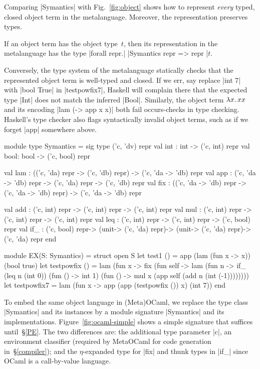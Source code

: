 Comparing |Symantics| with Fig.~\ref{fig:object}
shows how to represent \emph{every} typed, closed object term in the
metalanguage. Moreover, the representation preserves types.
\begin{proposition}
If an object term has the object type~$t$, then its
representation in the metalanguage has the type 
|forall repr.| |Symantics repr => repr |$t$.
\end{proposition}
Conversely, the type system of the metalanguage statically checks that the
represented object term is well-typed and closed.
If we err, say replace |int 7| with |bool True| in
|testpowfix7|, Haskell will complain there that the expected type |Int| does not
match the inferred |Bool|.  Similarly, the object term $\mathopen{\lambda\mathord{x}.\,}xx$ and its
encoding |lam (\x -> app x x)| both fail occurs-checks in type checking.
Haskell's type checker also flags syntactically invalid object terms, 
such as if we forget |app| somewhere above.

\begin{figure*}[t]
\begin{floatrule}
\begin{code}
module type Symantics = sig type ('c, 'dv) repr
  val int : int  -> ('c, int) repr
  val bool: bool -> ('c, bool) repr

  val lam : (('c, 'da) repr -> ('c, 'db) repr) -> ('c, 'da -> 'db) repr
  val app : ('c, 'da -> 'db) repr -> ('c, 'da) repr -> ('c, 'db) repr
  val fix : (('c, 'da -> 'db) repr -> ('c, 'da -> 'db) repr) -> ('c, 'da -> 'db) repr

  val add : ('c, int) repr -> ('c, int) repr -> ('c, int) repr
  val mul : ('c, int) repr -> ('c, int) repr -> ('c, int) repr
  val leq : ('c, int) repr -> ('c, int) repr -> ('c, bool) repr
  val if_ : ('c, bool) repr-> (unit-> ('c, 'da) repr)-> (unit-> ('c, 'da) repr)-> ('c, 'da) repr
end

module EX(S: Symantics) = struct open S
  let test1 () = app (lam (fun x -> x)) (bool true)
  let testpowfix () =  lam (fun x -> fix (fun self -> lam (fun n ->
                         if_ (leq n (int 0)) (fun () -> int 1)
                             (fun () -> mul x (app self (add n (int (-1))))))))
  let testpowfix7 =  lam (fun x -> app (app (testpowfix ()) x) (int 7))
end
\end{code}
\end{floatrule}
\caption{A simple (Meta)OCaml embedding of our object language}
\label{fig:ocaml-simple}
\end{figure*}
To embed the same object language in (Meta)OCaml, we replace the type
class |Symantics| and its instances by a module signature |Symantics|
and its implementations.  Figure~\ref{fig:ocaml-simple} shows a simple
signature that suffices until~\S\ref{PE}.  The two differences are:
the additional type parameter |c|, an
environment classifier \cite{WalidPOPL03} (required by MetaOCaml for
code generation in~\S\ref{compiler}); and the $\eta$-expanded type for
|fix| and thunk types in |if_| since OCaml is a call-by-value
language.

